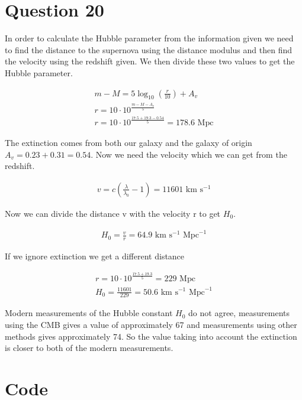 \documentclass[a4paper]{article}
\begin{document}
\section*{Question 20}

In order to calculate the Hubble parameter from the information given we need to find the distance to the supernova using the distance modulus and then find the velocity using the redshift given. We then divide these two values to get the Hubble parameter.

\begin{align}
    m-M = 5 \log_{10} \left ( \frac{r}{10} \right ) + A_v \\
    r = 10 \cdot 10^{\frac{m-M-A_v}{5}} \\
    r = 10 \cdot 10^{\frac{17.5+19.3-0.54}{5}} = 178.6 \text{ Mpc}
\end{align}

The extinction comes from both our galaxy and the galaxy of origin $A_v = 0.23+0.31 = 0.54$. Now we need the velocity which we can get from the redshift.

\begin{align}
    v = c \left ( \frac{\lambda}{\lambda_0} - 1 \right ) = 11 601 \text{ km}\text{ s}^{-1}
\end{align}

Now we can divide the distance v with the velocity r to get $H_0$.

\begin{align}
    H_0 = \frac{v}{r} = 64.9 \text{ km}\text{ s}^{-1}\text{ Mpc}^{-1}
\end{align}

If we ignore extinction we get a different distance

\begin{align}
    r = 10 \cdot 10^{\frac{17.5+19.3}{5}} = 229 \text{ Mpc} \\
    H_0 = \frac{11601}{229} = 50.6 \text{ km}\text{ s}^{-1}\text{ Mpc}^{-1}
\end{align}

Modern measurements of the Hubble constant $H_0$ do not agree, measurements using the CMB gives a value of approximately 67 and measurements using other methods gives approximately 74. So the value taking into account the extinction is closer to both of the modern measurements. 

\pagebreak

\appendix


\section{Code}
\end{document}
